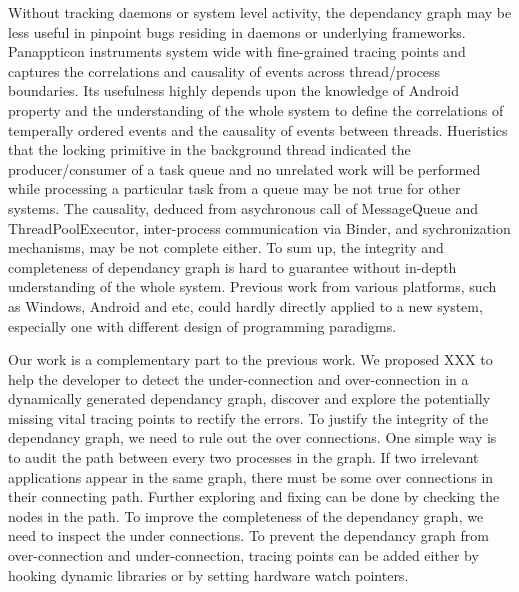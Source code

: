 Without tracking daemons or system level activity, the dependancy graph may be less useful in pinpoint bugs residing in daemons or underlying frameworks.
Panappticon instruments system wide with fine-grained tracing points and captures the correlations and causality of events across thread/process boundaries.
Its usefulness highly depends upon the knowledge of Android property and the understanding of the whole system to define the correlations of temperally ordered events and the causality of events between threads.
Hueristics that the locking primitive in the background thread indicated the producer/consumer of a task queue and no unrelated work will be performed while processing a particular task from a queue may be not true for other systems.
The causality, deduced from asychronous call of MessageQueue and ThreadPoolExecutor, inter-process communication via Binder, and sychronization mechanisms, may be not complete either.
To sum up, the integrity and completeness of dependancy graph is hard to guarantee without in-depth understanding of the whole system.
Previous work from various platforms, such as Windows, Android and etc, could hardly directly applied to a new system, especially one with different design of programming paradigms.
\par
Our work is a complementary part to the previous work.
We proposed XXX to help the developer to detect the under-connection and over-connection in a dynamically generated dependancy graph, discover and explore the potentially missing vital tracing points to rectify the errors. 
To justify the integrity of the dependancy graph, we need to rule out the over connections.
One simple way is to audit the path between every two processes in the graph.
If two irrelevant applications appear in the same graph, there must be some over connections in their connecting path.
Further exploring and fixing can be done by checking the nodes in the path.
To improve the completeness of the dependancy graph, we need to inspect the under connections.
To prevent the dependancy graph from over-connection and under-connection, tracing points can be added either by hooking dynamic libraries or by setting hardware watch pointers.
